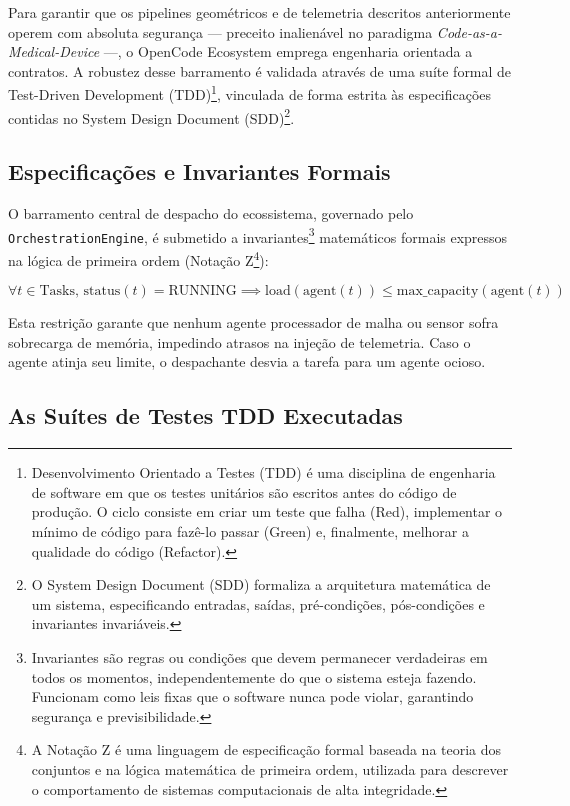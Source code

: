 Para garantir que os pipelines geométricos e de telemetria descritos anteriormente operem com absoluta segurança — preceito inalienável no paradigma \textit{Code-as-a-Medical-Device} —, o OpenCode Ecosystem emprega engenharia orientada a contratos. A robustez desse barramento é validada através de uma suíte formal de Test-Driven Development (TDD)\footnote{Desenvolvimento Orientado a Testes (TDD) é uma disciplina de engenharia de software em que os testes unitários são escritos antes do código de produção. O ciclo consiste em criar um teste que falha (Red), implementar o mínimo de código para fazê-lo passar (Green) e, finalmente, melhorar a qualidade do código (Refactor).}, vinculada de forma estrita às especificações contidas no System Design Document (SDD)\footnote{O System Design Document (SDD) formaliza a arquitetura matemática de um sistema, especificando entradas, saídas, pré-condições, pós-condições e invariantes invariáveis.}.

\subsection{Especificações e Invariantes Formais}

O barramento central de despacho do ecossistema, governado pelo \texttt{OrchestrationEngine}, é submetido a invariantes\footnote{Invariantes são regras ou condições que devem permanecer verdadeiras em todos os momentos, independentemente do que o sistema esteja fazendo. Funcionam como leis fixas que o software nunca pode violar, garantindo segurança e previsibilidade.} matemáticos formais expressos na lógica de primeira ordem (Notação Z\footnote{A Notação Z é uma linguagem de especificação formal baseada na teoria dos conjuntos e na lógica matemática de primeira ordem, utilizada para descrever o comportamento de sistemas computacionais de alta integridade.}):

\begin{equation}
    \forall t \in \text{Tasks}, \, \text{status}(t) = \text{RUNNING} \implies \text{load}(\text{agent}(t)) \le \text{max\_capacity}(\text{agent}(t))
\end{equation}

Esta restrição garante que nenhum agente processador de malha ou sensor sofra sobrecarga de memória, impedindo atrasos na injeção de telemetria. Caso o agente atinja seu limite, o despachante desvia a tarefa para um agente ocioso.

\subsection{As Suítes de Testes TDD Executadas}


